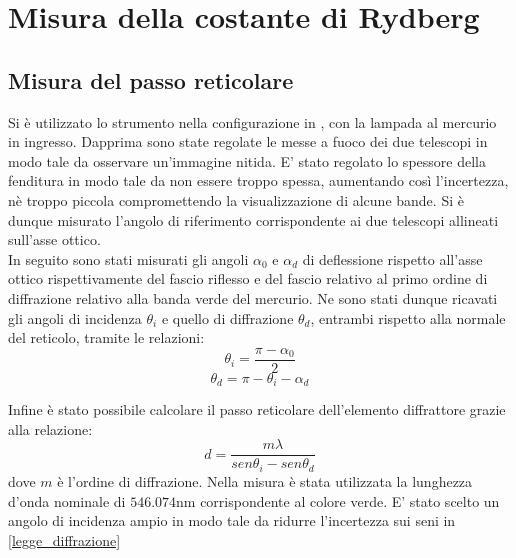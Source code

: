 \section{Misura della costante di Rydberg}

\subsection{Misura del passo reticolare}
Si è utilizzato lo strumento nella configurazione in , con la lampada al mercurio in ingresso. Dapprima sono state regolate le messe a fuoco dei due telescopi in modo tale da osservare un'immagine nitida. E' stato regolato lo spessore della fenditura in modo tale da non essere troppo spessa, aumentando così l'incertezza, nè troppo piccola compromettendo la visualizzazione di alcune bande. Si è dunque misurato l'angolo di riferimento corrispondente ai due telescopi allineati sull'asse ottico.\\
 In seguito sono stati misurati gli angoli $\alpha_{0}$ e $\alpha_{d}$ di deflessione rispetto all'asse ottico rispettivamente del fascio riflesso e del fascio relativo al primo ordine di diffrazione relativo alla banda verde del mercurio. Ne sono stati dunque ricavati gli angoli di incidenza $\theta_{i}$ e quello di diffrazione $\theta_{d}$, entrambi rispetto alla normale del reticolo, tramite le relazioni:
 \begin{equation}
 \theta_{i}=\frac{\pi-\alpha_{0}}{2}
 \end{equation}
 \begin{equation}
  \theta_{d}=\pi-\theta_{i}-\alpha_d
 \end{equation}
 
 Infine è stato possibile calcolare il passo reticolare dell'elemento diffrattore grazie alla relazione:
\begin{equation}
d = \frac{m\lambda}{sen\theta_{i} - sen\theta_{d}}
\label{legge_diffrazione}
\end{equation} 
dove $m$ è l'ordine di diffrazione. Nella misura è stata utilizzata la lunghezza d'onda nominale di $546.074$nm  corrispondente al colore verde. E' stato scelto un angolo di incidenza ampio in modo tale da ridurre l'incertezza sui seni in \ref{legge_diffrazione} \\

